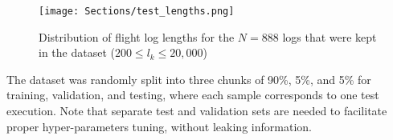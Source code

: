 \begin{figure}
    \centering
    \texttt{[image: Sections/test\_lengths.png]}
    \caption{Distribution of flight log lengths for the $N=888$ logs that were kept in the dataset ($200 \leq l_k \leq 20,000$)}
    \label{fig:test_lengths}
\end{figure}

The dataset was randomly split into three chunks of 90\%, 5\%, and 5\% for training, validation, and testing, where each sample corresponds to one test execution. Note that separate test and validation sets are needed to facilitate proper hyper-parameters tuning, without leaking information. 


